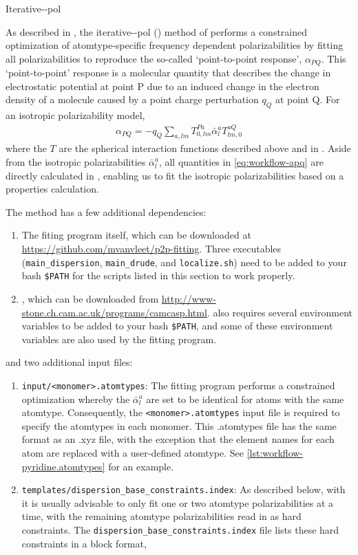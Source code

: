 \begin{subsubsection}{Iterative-\dma-pol}
\label{sec:workflow-jesse}

As described in , the iterative-\dma-pol (\idma) method of
\citeauthor{McDaniel2013} performs a constrained optimization of
atomtype-specific frequency dependent polarizabilities by fitting all
polarizabilities to reproduce the so-called `point-to-point response',
$\alpha_{PQ}$. This `point-to-point' response is a
molecular quantity that
describes the change in electrostatic potential at point P due to an induced
change in the electron density of a molecule caused by a point charge
perturbation $q_Q$ at point Q. For an isotropic polarizability model,
%
\begin{align}
\label{eq:workflow-apq}
\alpha_{PQ} = -q_Q \sum\limits_{a,lm} T^{Pa}_{0,lm} \bar{\alpha}^a_l T^{aQ}_{lm,0}
\end{align}
%
where the $T$ are the spherical interaction functions described above and in
. Aside from the isotropic polarizabilities
$\bar{\alpha}^a_l$, all quantities in \cref{eq:workflow-apq} are directly
calculated in \camcasp, enabling us to fit
the isotropic polarizabilities based on a \camcasp properties calculation.

The \idma method has a few additional dependencies: 
\begin{enumerate}
\item The \idma fiting program itself, which can be downloaded at
\url{https://github.com/mvanvleet/p2p-fitting}. Three executables
(\verb|main_dispersion|, \verb|main_drude|, and \verb|localize.sh|) need to be added to your bash
\verb|$PATH| for the scripts listed in this section to work properly.
%
\item \camcasp, which can be downloaded from 
\url{http://www-stone.ch.cam.ac.uk/programs/camcasp.html}. \camcasp also
requires several environment variables to be added to your bash \verb|$PATH|, and some of these
environment variables are also used by the \idma fitting program.
%
\end{enumerate}
and two additional input files:
\begin{enumerate}
\item \verb|input/<monomer>.atomtypes|: The \idma fitting program performs
a constrained optimization whereby the $\bar{\alpha}^a_l$ are set to be
identical for atoms with the same atomtype. Consequently, the
\verb|<monomer>.atomtypes| input file is required to specify the atomtypes in
each monomer. This .atomtypes file has the same
format as an .xyz file, with the exception that the element names for each atom
are replaced with a user-defined atomtype. See
\cref{lst:workflow-pyridine.atomtypes} for an example.
%
\item \verb|templates/dispersion_base_constraints.index|: As described below,
with \idma it is usually advisable to only fit one or two atomtype polarizabilities at a
time, with the remaining atomtype polarizabilities read in as hard
constraints. The \verb|dispersion_base_constraints.index| file lists these
hard constraints in a block format, 


\end{enumerate}
\end{subsubsection}
